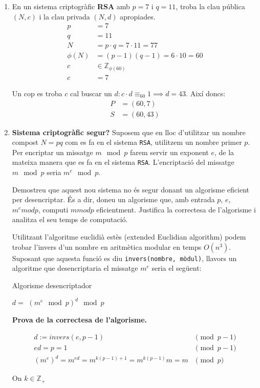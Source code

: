 \documentclass[a4paper]{article}
\begin{document}
\begin{enumerate}
\begin{enumerate}
\end{enumerate} 

\item En un sistema criptogràfic \textbf{RSA} amb $p = 7$ i $q = 11$, troba la clau pública $(N, c)$ i la clau privada $(N, d)$ apropiades.
\begin{align*}
	p &= 7 \\
	q &= 11 \\
	N &= p \cdot q = 7 \cdot 11 = 77 \\
	\phi(N) &= (p - 1)(q - 1) = 6 \cdot 10 = 60 \\
	c &\in \mathbb{Z}_{\phi(60)} \\
	c &= 7
\end{align*}

Un cop es troba $c$ cal buscar un $d : c \cdot d \equiv_{60} 1 \implies d = 43$. Així doncs:
\begin{align*}
	P &= (60, 7) \\
	S &= (60, 43)
\end{align*}

\item \textbf{Sistema criptogràfic segur?} Suposem que en lloc d'utilitzar un nombre compost $N = pq$ com es fa en el sistema \texttt{RSA}, utilitzem un nombre primer $p$. Per encriptar un missatge $m \mod p$ farem servir un exponent $e$, de la mateixa manera que es fa en el sistema \texttt{RSA}. L'encriptació del missatge $m \mod p$ seria $m^e \mod p$.

Demostreu que aquest nou sistema no és segur donant un algorisme eficient per
desencriptar. És a dir, doneu un algorisme que, amb entrada $p$, $e$, $m^e mod p$, computi $m mod p$ eficientment. Justifica la correctesa de l'algorisme i analitza el seu temps de computació.

Utilitzant l'algoritme euclidià estès (extended Euclidian algorithm) podem trobar l'invers d'un nombre en aritmètica modular en temps $O(n^3)$. Suposant que aquesta funció es diu \texttt{invers(nombre, mòdul)}, llavors un algoritme que desencriptaria el missatge $m^e$ seria el següent:

\begin{algorithm}[H]
	\caption{Algorisme desencriptador}
	\begin{algorithmic}
			\State $d =$ 
			\State \Return $(m^e \mod p)^d \mod p$
		\EndFunction
	\end{algorithmic}
\end{algorithm}

\textbf{Prova de la correctesa de l'algorisme.}

\begin{align*}
	d := invers(e, p-1) &\pmod{p-1} \\
	e d = p = 1 &\pmod{p-1} \\
	(m^e)^d = m^{e d} = m^{k(p-1)+1} = m^{k(p-1)} m = m &\pmod{p}
\end{align*}

On $k \in \mathbb{Z}_+$

\end{enumerate}
\end{document}

